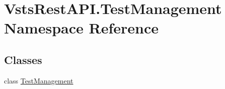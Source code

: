 \hypertarget{namespace_vsts_rest_a_p_i_1_1_test_management}{}\section{Vsts\+Rest\+A\+P\+I.\+Test\+Management Namespace Reference}
\label{namespace_vsts_rest_a_p_i_1_1_test_management}
\subsection*{Classes}
\begin{DoxyCompactItemize}
\item 
class \mbox{\hyperlink{class_vsts_rest_a_p_i_1_1_test_management_1_1_test_management}{Test\+Management}}
\end{DoxyCompactItemize}
